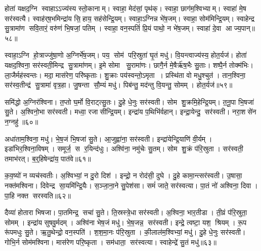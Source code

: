 होता॑ यक्षद॒ग्नि स्वाहाऽऽज्य॑स्य स्तो॒कानाम्।
स्वाहा॒ मेद॑सां॒ पृथ॑क्।
स्वाहा॒ छाग॑म॒श्विभ्याम्।
स्वाहा॑ मे॒ष सर॑स्वत्यै।
स्वाह॑र्‌ष॒भमिन्द्रा॑य सि॒हाय॒ सह॑सेन्द्रि॒यम्।
स्वाहा॒ऽग्निन्न भे॑ष॒जम्।
स्वाहा॒ सोम॑मिन्द्रि॒यम्।
स्वाहेन्द्र सु॒त्रामा॑ण सवि॒तारं॒ वरु॑णं भि॒षजां॒ पतिम्।
स्वाहा॒ वन॒स्पतिं॑ प्रि॒यं पाथो॒ न भे॑ष॒जम्।
स्वाहा॑ दे॒वा आज्य॒पान्॥५८॥

स्वाहा॒ऽग्नि हो॒त्राज्जु॑षा॒णो अ॒ग्निर्भे॑ष॒जम्।
पय॒ सोम॑ परि॒स्रुता॑ घृ॒तं मधु॑।
वि॒यन्त्वाज्य॑स्य॒ होत॒र्यज॑।
होता॑ यक्षद॒श्विना॒ सर॑स्वती॒मिन्द्र सु॒त्रामा॑णम्।
इ॒मे सोमा सु॒रामा॑णः।
छागै॒र्न मे॒षैर्\mbox{}ऋ॑ष॒भैः सु॒ताः।
शष्पै॒र्न तोक्म॑भिः।
ला॒जैर्मह॑स्वन्तः।
मदा॒ मास॑रेण॒ परि॑ष्कृताः।
शु॒क्राः पय॑स्वन्तो॒ऽमृता।
प्रस्थि॑ता वो मधु॒श्चुत॑।
तान॒श्विना॒ सर॑स्व॒तीन्द्र॑ सु॒त्रामा॑ वृत्र॒हा।
जु॒षन्ता सौ॒म्यं मधु॑।
पिब॑न्तु॒ मद॑न्तु वि॒यन्तु॒ सोमम्।
होत॒र्यज॑॥५९॥\anuvakamend[वी॒र्यं॑ वि॒यन्त्वाज्य॑स्य॒ होत॒र्यज॒ नास॑त्या॒ सर॑स्वती॒ मधु॑ हिर॒ण्ययं॑ भेष॒जं वि॒यन्त्वाज्य॑स्य॒ होत॒र्यजाज्य॒पान॒मृता॒ पञ्च॑ च (स॒मिधा॒ऽग्नि षट्।
तनू॒नपात्स॒प्त।
नरा॒शस॒मृषि॑।
इ॒डेडि॒तो यवै॑र॒ष्टौ।
ब॒र्‌हि॒ स॒प्त।
दुरो॒ऽश्विना॒ नव॑।
सु॒पेश॒सर्‌षि॑।
दैव्या॒ होता॑रा॒ सीसे॑न॒ रस॑।
ति॒स्रस्त्वष्टा॑रम॒ष्टाव॑ष्टौ।
वन॒स्पति॒मृषि॑।
अ॒ग्निन्त्रयो॑दश।
अ॒श्विना॒ द्वाद॑श त्रयोदश।
स॒मिधा॒ऽग्निं बद॑रै॒र्बद॑रै॒र्यवै॑र॒श्विना॒ त्विषि॑म॒श्विना॒ न भे॑ष॒ज रू॒पम॒श्विना॑ भी॒मं भामम् ॥ )]

समि॑द्धो अ॒ग्निर॑श्विना।
त॒प्तो घ॒र्मो वि॒राट्त्सु॒तः।
दु॒हे धे॒नुः सर॑स्वती।
सोम शु॒क्रमि॒हेन्द्रि॒यम्।
त॒नू॒पा भि॒षजा॑ सु॒ते।
अ॒श्विनो॒भा सर॑स्वती।
मध्वा॒ रजासीन्द्रि॒यम्।
इन्द्रा॑य प॒थिभि॑र्वहान्।
इन्द्रा॒येन्दु॒ सर॑स्वती।
नरा॒शसे॑न न॒ग्नहु॑॥६०॥

अधा॑ताम॒श्विना॒ मधु॑।
भे॒ष॒जं भि॒षजा॑ सु॒ते।
आ॒जुह्वा॑ना॒ सर॑स्वती।
इन्द्रा॑येन्द्रि॒याणि॑ वी॒र्यम्।
इडा॑भिर॒श्विना॒विषम्।
समूर्ज॒ स र॒यिन्द॑धुः।
अश्वि॑ना॒ नमु॑चेः सु॒तम्।
सोम शु॒क्रं प॑रि॒स्रुता।
सर॑स्वती॒ तमाभ॑रत्।
ब॒र्॒हिषेन्द्रा॑य॒ पात॑वे॥६१॥

क॒व॒ष्यो॑ न व्यच॑स्वतीः।
अ॒श्विभ्यां॒ न दु॒रो दिश॑।
इन्द्रो॒ न रोद॑सी॒ दुघे।
दु॒हे कामा॒न्त्सर॑स्वती।
उ॒षासा॒ नक्त॑मश्विना।
दिवेन्द्र सा॒यमि॑न्द्रि॒यैः।
स॒ञ्जा॒ना॒ने सु॒पेश॑सा।
समं॑ जाते॒ सर॑स्वत्या।
पा॒तं नो॑ अश्विना॒ दिवा।
पा॒हि नक्त सरस्वति॥६२॥

दैव्या॑ होतारा भिषजा।
पा॒तमिन्द्र॒ सचा॑ सु॒ते।
ति॒स्रस्त्रे॒धा सर॑स्वती।
अ॒श्विना॒ भार॒तीडा।
ती॒व्रं प॑रि॒स्रुता॒ सोमम्।
इन्द्रा॑य सुषवु॒र्मदम्।
अश्वि॑ना भेष॒जं मधु॑।
भे॒ष॒जन्न॒ सर॑स्वती।
इन्द्रे॒ त्वष्टा॒ यश॒ श्रियम्।
रू॒प रू॑पमधुः सु॒ते।
ऋ॒तु॒थेन्द्रो॒ वन॒स्पति॑।
श॒श॒मा॒नः प॑रि॒स्रुता।
की॒लाल॑म॒श्विभ्यां॒ मधु॑।
दु॒हे धे॒नुः सर॑स्वती।
गोभि॒र्न सोम॑मश्विना।
मास॑रेण परि॒ष्कृता।
सम॑धाता॒ सर॑स्वत्या।
स्वाहेन्द्रे॑ सु॒तं मधु॑॥६३॥\anuvakamend[न॒ग्नहु॒ पात॑वे सरस्वत्यधुः सु॒तेऽष्टौ च॑]

